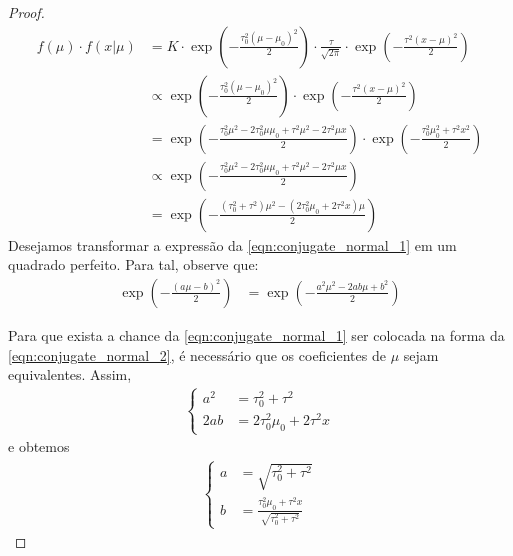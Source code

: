 \begin{proof}
 \begin{align}
  \label{eqn:conjugate_normal_1}
  f(\mu) \cdot f(x|\mu)
  &= K \cdot \exp\left(-\frac{\tau_{0}^{2}(\mu-\mu_{0})^{2}}{2}\right)
  \cdot \frac{\tau}{\sqrt{2\pi}} \cdot \exp\left(-\frac{\tau^{2}(x-\mu)^{2}}{2}\right) \nonumber \\
  &\propto \exp\left(-\frac{\tau_{0}^{2}(\mu-\mu_{0})^{2}}{2}\right) \cdot \exp\left(-\frac{\tau^{2}(x-\mu)^{2}}{2}\right)	\nonumber \\
  &= \exp\left(-\frac{\tau_{0}^{2}\mu^{2}-2\tau_{0}^{2}\mu\mu_{0}+\tau^{2}\mu^{2}-2\tau^{2}\mu x}{2}\right) \cdot \exp\left(-\frac{\tau_{0}^{2}\mu_{0}^{2}+\tau^{2}x^{2}}{2}\right) \nonumber \\
  &\propto \exp\left(-\frac{\tau_{0}^{2}\mu^{2}-2\tau_{0}^{2}\mu\mu_{0}+\tau^{2}\mu^{2}-2\tau^{2}\mu x}{2}\right) \nonumber \\
  &= \exp\left(-\frac{(\tau_{0}^{2}+\tau^{2})\mu^{2}-(2\tau_{0}^{2}\mu_{0}+2\tau^{2}x)\mu}{2}\right)
 \end{align}
 Desejamos transformar a expressão da
 \cref{eqn:conjugate_normal_1} em um quadrado perfeito.
 Para tal, observe que:
 \begin{align}
  \label{eqn:conjugate_normal_2}
  \exp\left(-\frac{(a\mu-b)^{2}}{2}\right)
  &= \exp\left(-\frac{a^{2}\mu^{2}-2ab\mu+b^{2}}{2}\right)
 \end{align}

 Para que exista a chance da 
 \cref{eqn:conjugate_normal_1} ser colocada na
 forma da \cref{eqn:conjugate_normal_2},
 é necessário que os coeficientes de $\mu$ sejam
 equivalentes. Assim,
 \begin{align*}
  \begin{cases}
   a^{2} &= \tau_{0}^{2}+\tau^{2} \\
   2ab &= 2\tau_{0}^{2}\mu_{0}+2\tau^{2}x
  \end{cases}
 \end{align*}
 e obtemos
 \begin{align}
  \label{eqn:conjugate_normal_3}
  \begin{cases}
   a &= \sqrt{\tau_{0}^{2}+\tau^{2}} \\
   b &= \frac{\tau_{0}^{2}\mu_{0}+\tau^{2}x}
   {\sqrt{\tau_{0}^{2}+\tau^{2}}}
  \end{cases}
 \end{align}


\end{proof}
